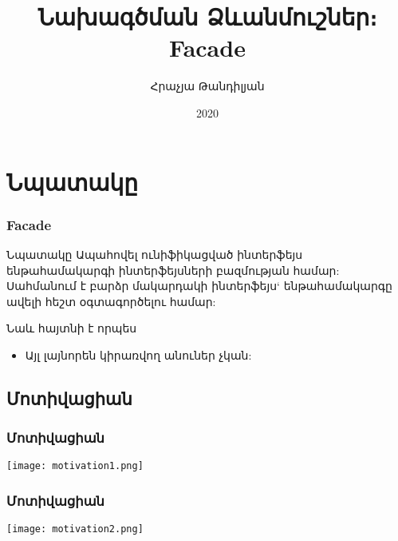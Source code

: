 \documentclass{beamer}
\begin{document}
\title[Facade]{Նախագծման Ձևանմուշներ։ Facade}
\author[Հրաչյա Թանդիլյան\copyright]{Հրաչյա Թանդիլյան}
\date{2020}

\begin{frame}
\titlepage
\end{frame}

\section{Նպատակը}
\begin{frame}\frametitle{Facade}
\begin{block}{Նպատակը}
    Ապահովել ունիֆիկացված ինտերֆեյս ենթահամակարգի ինտերֆեյսների բազմության համար:
    Սահմանում է բարձր մակարդակի ինտերֆեյս` ենթահամակարգը ավելի հեշտ օգտագործելու համար:
\end{block}
\vfill
Նաև հայտնի է որպես
\begin{itemize}
    \item Այլ լայնորեն կիրառվող անուներ չկան:
\end{itemize}
\end{frame}

\subsection{Մոտիվացիան}
\begin{frame}\frametitle{Մոտիվացիան}
\begin{center}
    \texttt{[image: motivation1.png]}
\end{center}
\end{frame}

\begin{frame}\frametitle{Մոտիվացիան}
\begin{center}
    \texttt{[image: motivation2.png]}
\end{center}
\end{frame}
\end{document}
